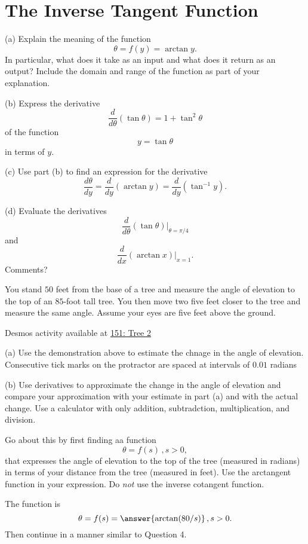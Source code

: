 \documentclass{ximera}
\begin{document}
\section*{The Inverse Tangent Function}
\begin{question}  \label{Q:KKDbret434}
(a) Explain the meaning of the function
\[
        \theta = f(y) = \arctan y .
\]
In particular, what does it take as an input and what does it return as an output? Include the domain and range of the function as part of your explanation.

(b) Express the derivative
\[
     \frac{d}{d\theta} \left( \tan\theta  \right) = 1 + \tan^2\theta
\]
of the function 
\[
    y = \tan\theta
\]
in terms of $y$.

(c) Use part (b) to find an expression for the derivative
\[
   \frac{d\theta}{dy} = \frac{d}{dy} \left(  \arctan y \right) =  \frac{d}{dy} \left(  \tan^{-1} y \right) .
\]

(d) Evaluate the derivatives
\[
   \frac{d}{d\theta} \left( \tan\theta  \right)\Big|_{\theta = \pi/4}
\]
and
\[
  \frac{d}{dx} \left(  \arctan x \right)\Big|_{x=1} . 
\]
Comments?
\end{question}

\begin{question}  \label{Q45544fhL}
You stand $50$ feet from the base of a tree and measure the angle of elevation to the top of an $85$-foot tall tree. You then move two five feet closer to the tree and measure the same angle. Assume your eyes are five feet above the ground. 

\begin{onlineOnly}
    \begin{center}
\end{center}
\end{onlineOnly}

Desmos activity available at \href{https://www.desmos.com/calculator/cboknvfhnf}{151: Tree 2}


(a) Use the demonstration above to estimate the chnage in the angle of elevation. Consecutive tick marks on the protractor are spaced at intervals of $0.01$ radians

(b) Use derivatives to approximate the change in the angle of elevation and compare your approximation with your estimate in part (a) and with the actual change. Use a calculator with only addition, subtradction, multiplication, and division.

Go about this by first finding aa function
\[
    \theta = f(s) \, , s>0 ,
\]
that expresses the angle of elevation to the top of the tree (measured in radians) in terms of your distance from the tree (measured in feet). Use the arctangent function in your expression. Do \emph{not} use the inverse cotangent function.

The function is 
\[
      \theta = f(s)  = \answer{\arctan(80/s)} \, , s>0 .
\]
Then continue in a manner similar to Question 4.

\end{question}
\end{document}
